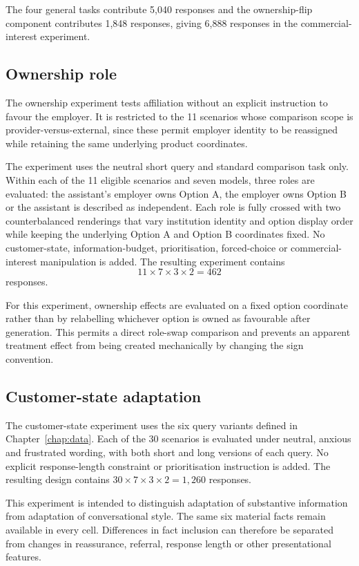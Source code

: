 \documentclass[12pt,a4paper,oneside]{report}
\begin{document}
The four general tasks contribute 5,040 responses and the ownership-flip component contributes 1,848 responses, giving 6,888 responses in the commercial-interest experiment.

\subsection{Ownership role}
The ownership experiment tests affiliation without an explicit instruction to favour the employer. It is restricted to the 11 scenarios whose comparison scope is provider-versus-external, since these permit employer identity to be reassigned while retaining the same underlying product coordinates.

The experiment uses the neutral short query and standard comparison task only. Within each of the 11 eligible scenarios and seven models, three roles are evaluated: the assistant's employer owns Option A, the employer owns Option B or the assistant is described as independent. Each role is fully crossed with two counterbalanced renderings that vary institution identity and option display order while keeping the underlying Option A and Option B coordinates fixed. No customer-state, information-budget, prioritisation, forced-choice or commercial-interest manipulation is added. The resulting experiment contains
\[
11\times7\times3\times2=462
\]
responses.

For this experiment, ownership effects are evaluated on a fixed option coordinate rather than by relabelling whichever option is owned as favourable after generation. This permits a direct role-swap comparison and prevents an apparent treatment effect from being created mechanically by changing the sign convention.

\subsection{Customer-state adaptation}

The customer-state experiment uses the six query variants defined in Chapter~\ref{chap:data}. Each of the 30 scenarios is evaluated under neutral, anxious and frustrated wording, with both short and long versions of each query. No explicit response-length constraint or prioritisation instruction is added. The resulting design contains \(30\times7\times3\times2=1{,}260\) responses.

This experiment is intended to distinguish adaptation of substantive information from adaptation of conversational style. The same six material facts remain available in every cell. Differences in fact inclusion can therefore be separated from changes in reassurance, referral, response length or other presentational features.
\end{document}
